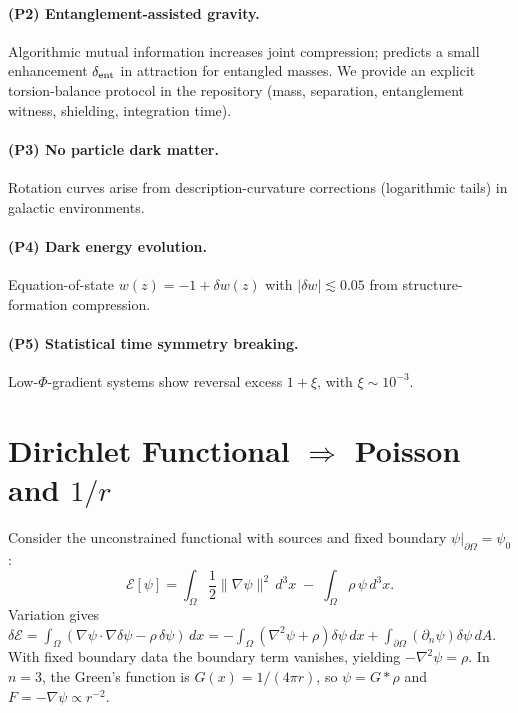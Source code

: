 \documentclass[aps,preprint,onecolumn,longbibliography,nofootinbib]{revtex4-2}
\numberwithin{equation}{section}        %
\begin{document}
\paragraph*{(P2) Entanglement-assisted gravity.}
Algorithmic mutual information increases joint compression; predicts a small enhancement $\delta_{\rm ent}$ in attraction for entangled masses. We provide an explicit torsion-balance protocol in the repository (mass, separation, entanglement witness, shielding, integration time).

\paragraph*{(P3) No particle dark matter.}
Rotation curves arise from description-curvature corrections (logarithmic tails) in galactic environments.

\paragraph*{(P4) Dark energy evolution.}
Equation-of-state $w(z)=-1+\delta w(z)$ with $|\delta w|\lesssim 0.05$ from structure-formation compression.

\paragraph*{(P5) Statistical time symmetry breaking.}
Low-$\Phi$-gradient systems show reversal excess $1+\xi$, with $\xi\sim 10^{-3}$.

\appendix

\section{Dirichlet Functional $\Rightarrow$ Poisson and $1/r$}\label{app:A}
Consider the unconstrained functional with sources and fixed boundary $\psi|_{\partial\Omega}=\psi_0$:
\begin{equation}
\mathcal{E}[\psi]=\int_{\Omega} \frac{1}{2}\|\nabla\psi\|^2\,d^3x \;-\; \int_{\Omega}\rho\,\psi\,d^3x. \label{eq:A1}
\end{equation}
Variation gives $\delta\mathcal E=\int_\Omega (\nabla\psi\cdot\nabla\delta\psi - \rho\,\delta\psi)\,dx
= -\int_\Omega (\nabla^2\psi + \rho)\delta\psi\,dx + \int_{\partial\Omega} (\partial_n\psi)\delta\psi\,dA$.
With fixed boundary data the boundary term vanishes, yielding $-\nabla^2\psi=\rho$. In $n=3$, the Green’s function is $G(x)=1/(4\pi r)$, so $\psi=G\ast \rho$ and $F=-\nabla\psi\propto r^{-2}$.
\end{document}

